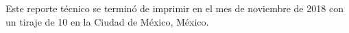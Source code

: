 %
%

\clearpage
\thispagestyle{plain}

\vspace*{\fill}
  Este reporte técnico se terminó de imprimir en el mes de noviembre de 2018
  con un tiraje de 10 en la Ciudad de México, México.
\vspace*{\fill}
\newpage
